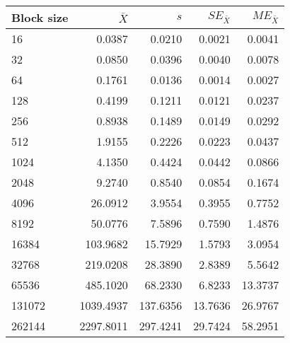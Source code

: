 \begin{tabular}{lrrrr}\toprule
{\small Block size} & $\bar{X}$ & $s$ & $SE_{\bar{X}}$ & $ME_{\bar{X}}$ \\\midrule
16 & 0.0387 & 0.0210 & 0.0021 & 0.0041\\
32 & 0.0850 & 0.0396 & 0.0040 & 0.0078\\
64 & 0.1761 & 0.0136 & 0.0014 & 0.0027\\
128 & 0.4199 & 0.1211 & 0.0121 & 0.0237\\
256 & 0.8938 & 0.1489 & 0.0149 & 0.0292\\
512 & 1.9155 & 0.2226 & 0.0223 & 0.0437\\
1024 & 4.1350 & 0.4424 & 0.0442 & 0.0866\\
2048 & 9.2740 & 0.8540 & 0.0854 & 0.1674\\
4096 & 26.0912 & 3.9554 & 0.3955 & 0.7752\\
8192 & 50.0776 & 7.5896 & 0.7590 & 1.4876\\
16384 & 103.9682 & 15.7929 & 1.5793 & 3.0954\\
32768 & 219.0208 & 28.3890 & 2.8389 & 5.5642\\
65536 & 485.1020 & 68.2330 & 6.8233 & 13.3737\\
131072 & 1039.4937 & 137.6356 & 13.7636 & 26.9767\\
262144 & 2297.8011 & 297.4241 & 29.7424 & 58.2951\\
\bottomrule
\end{tabular}

